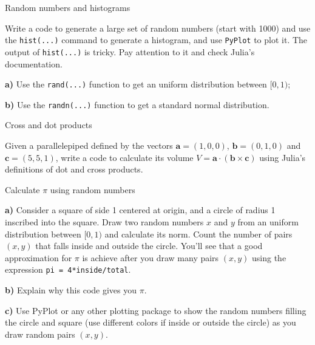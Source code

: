 \begin{problem}{Random numbers and histograms}
 
 Write a code to generate a large set of random numbers (start with 1000) and use the \texttt{hist(...)} command to generate a histogram, and use \texttt{PyPlot} to plot it. The output of \texttt{hist(...)} is tricky. Pay attention to it and check Julia's documentation.
 
 \textbf{a)} Use the \texttt{rand(...)} function to get an uniform distribution between $[0,1)$;
 
 \textbf{b)} Use the \texttt{randn(...)} function to get a standard normal distribution.
\end{problem}


\begin{problem}{Cross and dot products}

Given a parallelepiped defined by the vectors $\bm{a} = (1, 0, 0)$, $\bm{b} = (0, 1, 0)$ and $\bm{c} = (5, 5, 1)$, write a code to calculate its volume $V = \bm{a} \cdot (\bm{b} \times \bm{c})$ using Julia's definitions of dot and cross products.
\end{problem}


\begin{problem}{Calculate $\pi$ using random numbers}
 \label{prob:pi}
 
 \textbf{a)} Consider a square of side 1 centered at origin, and a circle of radius 1 inscribed into the square. Draw two random numbers $x$ and $y$ from an uniform distribution between $[0,1)$ and calculate its norm. Count the number of pairs $(x,y)$ that falls inside and outside the circle. You'll see that a good approximation for $\pi$ is achieve after you draw many pairs $(x,y)$ using the expression \texttt{pi = 4*inside/total}.
 
 \textbf{b)} Explain why this code gives you $\pi$.
 
 \textbf{c)} Use PyPlot or any other plotting package to show the random numbers filling the circle and square (use different colors if inside or outside the circle) as you draw random pairs $(x,y)$.
\end{problem}



